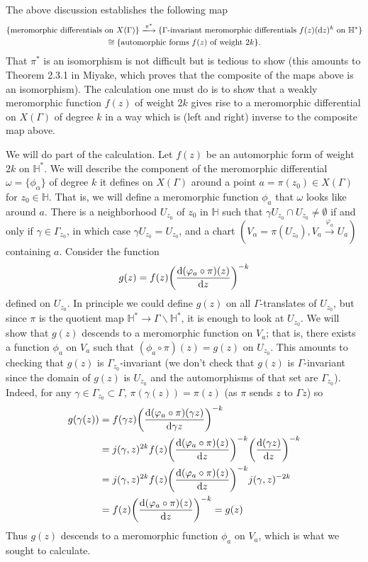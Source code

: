 \documentclass[11pt,leqno]{article}
\theoremstyle{plain}
\theoremstyle{definition}
\numberwithin{equation}{section}
\numberwithin{lem}{section}
\begin{document}
The above discussion establishes the following map
\begin{multline*}
    \{\text{meromorphic differentials on $X(\Gamma)$}\}\xlongrightarrow{\pi^\ast}\{\Gamma\text{-invariant meromorphic differentials }f(z)(\dd z)^k\text{ on }\mathbb H^\ast\}\\\cong \{\text{automorphic forms }f(z)\text{ of weight $2k$}\}.
\end{multline*}
That $\pi^\ast$ is an isomorphism is not difficult but is tedious to show (this amounts to Theorem 2.3.1 in Miyake, which proves that the composite of the maps above is an isomorphism). The calculation one must do is to show that a weakly meromorphic function $f(z)$ of weight $2k$ gives rise to a meromorphic differential on $X(\Gamma)$ of degree $k$ in a way which is (left and right) inverse to the composite map above.

We will do part of the calculation. Let $f(z)$ be an automorphic form of weight $2k$ on $\mathbb H^\ast$. We will describe the component of the meromorphic differential $\omega = \{\phi_\alpha\}$ of degree $k$ it defines on $X(\Gamma)$ around a point $a = \pi(z_0)\in X(\Gamma)$ for $z_0\in \mathbb H$. That is, we will define a meromorphic function $\phi_a$ that $\omega$ looks like around $a$. There is a neighborhood $U_{z_0}$ of $z_0$ in $\mathbb H$ such that $\gamma U_{z_0}\cap U_{z_0}\neq \emptyset$ if and only if $\gamma\in \Gamma_{z_0}$, in which case $\gamma U_{z_0} = U_{z_0}$, and a chart $(V_\alpha = \pi(U_{z_0}), V_a\xrightarrow{\varphi_a}U_a)$ containing $a$. Consider the function 
\[g(z)= f(z)\biggl(\dv{(\varphi_a\circ\pi)(z)}{z}\biggr)^{-k}\]
defined on $U_{z_0}$. In principle we could define $g(z)$ on all $\Gamma$-translates of $U_{z_0}$, but since $\pi$ is the quotient map $\mathbb H^\ast\to\Gamma\backslash \mathbb H^\ast$, it is enough to look at $U_{z_0}$. We will show that $g(z)$ descends to a meromorphic function on $V_a$; that is, there exists a function $\phi_a$ on $V_a$ such that $(\phi_a\circ\pi)(z) = g(z)$ on $U_{z_0}$. This amounts to checking that $g(z)$ is $\Gamma_{z_0}$-invariant (we don't check that $g(z)$ is $\Gamma$-invariant since the domain of $g(z)$ is $U_{z_0}$ and the automorphisms of that set are $\Gamma_{z_0}$). Indeed, for any $\gamma\in \Gamma_{z_0}\subset\Gamma$, $\pi(\gamma(z)) = \pi(z)$ (as $\pi$ sends $z$ to $\Gamma z$) so
\begin{align*}
    g(\gamma(z)) &= f(\gamma z)\biggl(\dv{(\varphi_a\circ\pi)(\gamma z)}{\gamma z}\biggr)^{-k} \\
    &= j(\gamma,z)^{2k}f(z)\biggl(\dv{(\varphi_a\circ\pi)(z)}{z}\biggr)^{-k}\biggl(\dv{(\gamma z)}{z}\biggr)^{-k} \\
    &= j(\gamma,z)^{2k}f(z)\biggl(\dv{(\varphi_a\circ\pi)(z)}{z}\biggr)^{-k}j(\gamma,z)^{-2k}\\
    &= f(z)\biggl(\dv{(\varphi_a\circ\pi)(z)}{z}\biggr)^{-k} = g(z)
\end{align*}
Thus $g(z)$ descends to a meromorphic function $\phi_a$ on $V_a$, which is what we sought to calculate.
\end{document}
